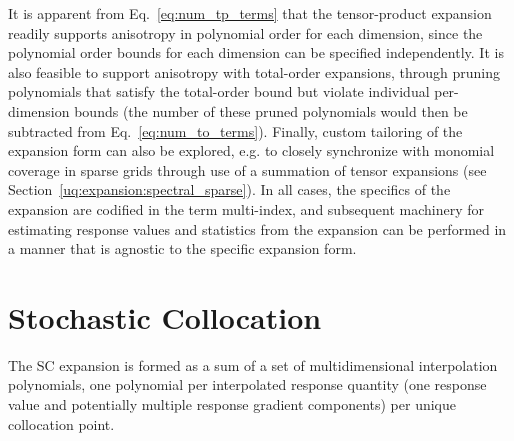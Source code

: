 It is apparent from Eq.~\ref{eq:num_tp_terms} that the tensor-product
expansion readily supports anisotropy in polynomial order for each
dimension, since the polynomial order bounds for each dimension can be
specified independently.  It is also feasible to support anisotropy
with total-order expansions, through pruning polynomials that satisfy 
the total-order bound 
but violate individual per-dimension bounds (the number of these
pruned polynomials would then be subtracted from
Eq.~\ref{eq:num_to_terms}).  Finally, custom tailoring of the
expansion form can also be explored, e.g. to closely synchronize with
monomial coverage in sparse grids through use of a summation of tensor
expansions (see Section~\ref{uq:expansion:spectral_sparse}).
In all cases, the specifics of the expansion are codified in the
term multi-index, and subsequent machinery for estimating response 
values and statistics from the expansion
can be performed in a manner that is agnostic to the specific 
expansion form.


\section{Stochastic Collocation} \label{uq:expansion:sc}


The SC expansion is formed as a sum of a set of multidimensional
interpolation polynomials, one polynomial per interpolated response
quantity (one response value and potentially multiple response
gradient components) per unique collocation point.  

